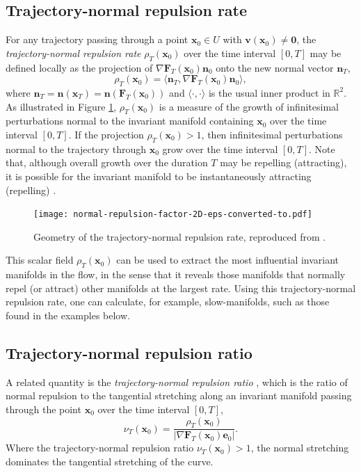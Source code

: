 \documentclass[twocolumn]{svjour3}
\begin{document}
\subsection{Trajectory-normal repulsion rate}
For any trajectory passing through a point $\mathbf{x}_0 \in U$ with 
$\mathbf{v}(\mathbf{x}_0) \ne \mathbf{0}$, the {\it trajectory-normal repulsion rate} $\rho_T(\mathbf{x}_0)$ \cite{haller_variational_2011} over the time interval $[0, T]$ may be defined locally as the projection of $\nabla\mathbf{F}_T (\mathbf{x}_0) \mathbf{n}_0 $ onto the new normal vector
$\mathbf{n}_T$,
\begin{equation}
\rho_T(\mathbf{x}_0) = \langle  \mathbf{n}_T , \nabla \mathbf{F}_T (\mathbf{x}_0) \mathbf{n}_0 \rangle,
\label{eq:reprate}
\end{equation}
where $\mathbf{n}_T = \mathbf{n}(\mathbf{x}_T) = \mathbf{n}(\mathbf{F}_T (\mathbf{x}_0))$ and $\langle\cdot,\cdot\rangle$ is the usual inner product in $\mathbb{R}^2$. 
As illustrated in Figure \ref{fig:normal-repulsion-factor-2D}, $\rho_T(\mathbf{x}_0)$ is a measure of the growth of infinitesimal perturbations normal to the invariant manifold containing $\mathbf{x}_0$ over the time interval $[0,T]$.
If the projection $\rho_T(\mathbf{x}_0) >1$, then infinitesimal perturbations normal to the trajectory through $\mathbf{x}_0$ grow over the time interval $[0,T]$. Note that, although overall growth over the duration $T$ may be repelling (attracting), it is possible for the invariant manifold to be instantaneously attracting (repelling) \cite{tallapragada2017globally}.
\begin{figure}
\centering
\texttt{[image: normal-repulsion-factor-2D-eps-converted-to.pdf]}
\caption{Geometry of the trajectory-normal repulsion rate, reproduced from \cite{nave2018global}.}
\label{fig:normal-repulsion-factor-2D}
\end{figure}

This scalar field $\rho_T(\mathbf{x}_0)$ can be used to extract the most influential invariant manifolds in the flow, in the sense that it reveals those manifolds that normally repel (or attract) other manifolds at the largest rate. Using this trajectory-normal repulsion rate, one can calculate, for example, slow-manifolds, such as those found in the examples below.

\subsection{Trajectory-normal repulsion ratio}
A related quantity is the {\it trajectory-normal repulsion ratio} \cite{haller_variational_2011}, which is the ratio of normal repulsion to the tangential stretching along an invariant manifold passing through the point $\textbf{x}_0$ over the time interval $[0, T]$,
\begin{equation}
\nu_T(\mathbf{x}_0) = \frac{\rho_T(\mathbf{x}_0)}{\left|\nabla\mathbf{F}_T (\mathbf{x}_0) \mathbf{e}_0\right|}.
\end{equation}
Where the trajectory-normal repulsion ratio \(\nu_T(\mathbf{x}_0)>1\), the normal stretching dominates the tangential stretching of the curve. 
\end{document}
